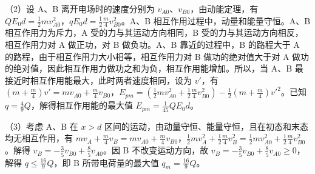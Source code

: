 \documentclass[\gkver]{gaokaozhenti}
\begin{document}
\begin{enumerate}
{（2）设 A、B 离开电场时的速度分别为 $v_{A0}$、$v_{B0}$，由动能定理，有 $QE_{0}d=\frac{1}{2}mv_{A0}^{2}$，$qE_{0}d=\frac{1}{2}\frac{m}{4}v_{B0}^{2}$。A、B 相互作用过程中，动量和能量守恒。A、B 相互作用力为斥力，A 受的力与其运动方向相同，B 受的力与其运动方向相反，相互作用力对 A 做正功，对 B 做负功。A、B 靠近的过程中，B 的路程大于 A 的路程，由于相互作用力大小相等，相互作用力对 B 做功的绝对值大于对 A 做功的绝对值，因此相互作用力做功之和为负，相互作用能增加。所以，当 A、B 最接近时相互作用能最大，此时两者速度相同，设为 $v'$，有 $(m+\frac{m}{4})v'=mv_{A0}+\frac{m}{4}v_{B0}$，$E_{pm}=(\frac{1}{2}mv_{A0}^{2}+\frac{1}{2}\frac{m}{4}v_{B0}^{2})-\frac{1}{2}(m+\frac{m}{4})v'^{2}$。已知 $q=\frac{4}{9}Q$，解得相互作用能的最大值 $E_{pm}=\frac{1}{45}QE_{0}d$。

（3）考虑 A、B 在 $x > d$ 区间的运动，由动量守恒、能量守恒，且在初态和末态均无相互作用，有 $mv_{A} + \frac{m}{4}v_{B} = mv_{A0} + \frac{m}{4}v_{B0}$，$\frac{1}{2}m v_{A}^{2}+\frac{1}{2}\frac{m}{4}v_{B}^{2}=\frac{1}{2}m v_{A0}^{2}+\frac{1}{2}\frac{m}{4}v_{B0}^{2}$。解得 $v_{B}=-\frac{3}{5}v_{B0}+\frac{8}{5}v_{A0}$。因 B 不改变运动方向，故 $v_{B}=-\frac{3}{5}v_{B0}+\frac{8}{5}v_{A0}\geq0$，解得 $q\leq\frac{16}{9}Q$，即 B 所带电荷量的最大值 $q_{m} = \frac{16}{9}Q$。
}

\end{enumerate}
\end{document}
